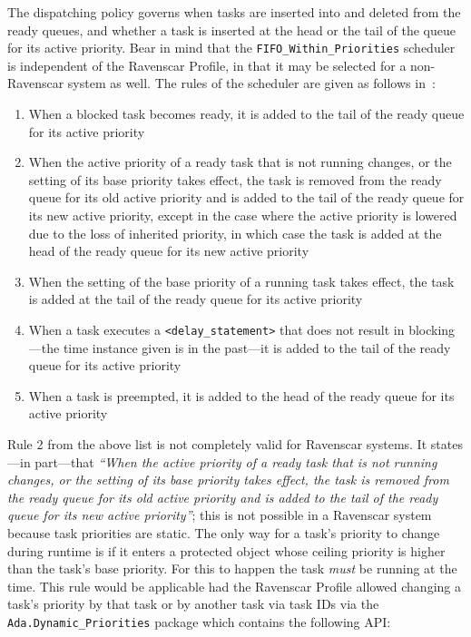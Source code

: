 The dispatching policy governs when tasks are inserted into and
deleted from the ready queues, and whether a task is inserted at the
head or the tail of the queue for its active priority. Bear in mind
that the \texttt{FIFO\_Within\_Priorities} scheduler is independent of
the Ravenscar Profile, in that it may be selected for a non-Ravenscar
system as well. The rules of the scheduler are given as follows
in~\cite{arm05}:

\begin{enumerate}
\item{When a blocked task becomes ready, it is added to the tail of
  the ready queue for its active priority}
\item{When the active priority of a ready task that is not running
  changes, or the setting of its base priority takes effect, the task
  is removed from the ready queue for its old active priority and is
  added to the tail of the ready queue for its new active priority,
  except in the case where the active priority is lowered due to the
  loss of inherited priority, in which case the task is added at the
  head of the ready queue for its new active priority}
\item{When the setting of the base priority of a running task takes
  effect, the task is added at the tail of the ready queue for its
  active priority}
\item{When a task executes a \texttt{<delay\_statement>} that does not
  result in blocking---the time instance given is in the past---it is
  added to the tail of the ready queue for its active priority}
\item{When a task is preempted, it is added to the head of the ready
  queue for its active priority}
\end{enumerate}

Rule 2 from the above list is not completely valid for Ravenscar
systems. It states---in part---that \emph{``When the active priority
  of a ready task that is not running changes, or the setting of its
  base priority takes effect, the task is removed from the ready queue
  for its old active priority and is added to the tail of the ready
  queue for its new active priority''}; this is not possible in a
Ravenscar system because task priorities are static. The only way for
a task's priority to change during runtime is if it enters a protected
object whose ceiling priority is higher than the task's base
priority. For this to happen the task \emph{must} be running at the
time. This rule would be applicable had the Ravenscar Profile allowed
changing a task's priority by that task or by another task via task
IDs via the \texttt{Ada.Dynamic\_Priorities} package which contains
the following API:

